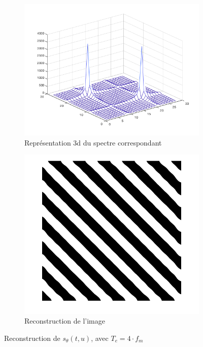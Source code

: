 \documentclass[a4paper]{article}
\begin{document}
\begin{figure}[H]
\begin{subfigure}[c]{0.46\textwidth}
        \centering
        \includegraphics[width=\textwidth]{images/ft53D.png}
        \caption{Représentation 3d du spectre correspondant}
    \label{subimg:ft-4-3D}
    \end{subfigure}
    \begin{subfigure}[c]{0.46\textwidth}
        \centering
        \includegraphics[width=\textwidth]{images/sin-r5.png}
        \caption{Reconstruction de l'image}
    \label{subimg:sin-4-r}
    \end{subfigure}
    \label{img:sin-4-reconstr}
    \caption{Reconstruction de $s_{\theta}(t,u)$, avec $T_e = 4 \cdot
    f_m$}
\end{figure}
\end{document}
